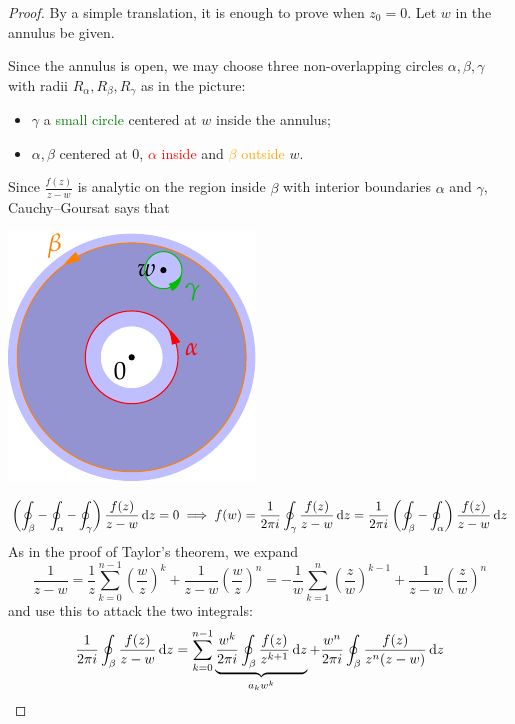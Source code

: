 \begin{proof}
By a simple translation, it is enough to prove when $z_0=0$. Let $w$ in the annulus be given.\par
\begin{minipage}[t]{0.7\linewidth}\vspace{0pt}
Since the annulus is open, we may choose three non-overlapping circles $\alpha,\beta,\gamma$ with radii $R_\alpha,R_\beta,R_\gamma$ as in the picture:
\begin{itemize}
  \item $\gamma$ a \textcolor{Green}{small circle} centered at $w$ inside the annulus;
  \item $\alpha,\beta$ centered at 0, \textcolor{red}{$\alpha$ inside} and \textcolor{orange}{$\beta$ outside} $w$. 
\end{itemize}
Since $\frac{f(z)}{z-w}$ is analytic on the region inside $\beta$ with interior boundaries $\alpha$ and $\gamma$, Cauchy--Goursat says that
\end{minipage}\begin{minipage}[t]{0.3\linewidth}\vspace{-5pt}
\flushright\includegraphics{laurent4}
\end{minipage}\par
\[\left(\oint_\beta-\oint_\alpha-\oint_\gamma\right)\frac{f(z)}{z-w}\,{\mathrm{d} z}=0\implies f(w)=\frac 1{2\pi i}\oint_\gamma\frac{f(z)}{z-w}\,{\mathrm{d} z} =\frac 1{2\pi i}\left(\oint_\beta-\oint_\alpha\right)\frac{f(z)}{z-w}\,{\mathrm{d} z}\]
As in the proof of Taylor's theorem, we expand
\[\frac 1{z-w}=\frac 1z\sum_{k=0}^{n-1}\left(\frac wz\right)^k +\frac 1{z-w}\left(\frac wz\right)^n =-\frac 1w\sum_{k=1}^{n}\left(\frac zw\right)^{k-1} +\frac 1{z-w}\left(\frac zw\right)^n\]
and use this to attack the two integrals:
\begin{gather*}
\frac 1{2\pi i}\oint_\beta\frac{f(z)}{z-w}\,\dz =\sum_{k=0}^{n-1}\underbrace{\frac{w^k}{2\pi i}\oint_\beta \frac{f(z)}{z^{k+1}}\,\dz}_{a_kw^k} +\frac{w^n}{2\pi i}\oint_\beta \frac{f(z)}{z^n(z-w)}\,\dz\\

\end{gather*}
\end{proof}
